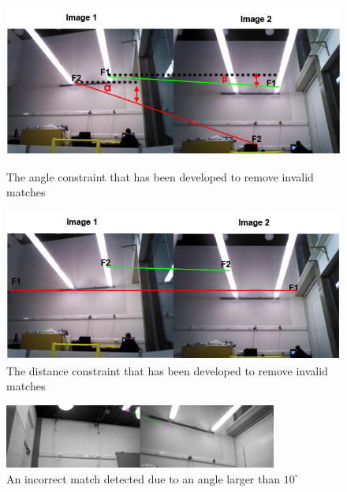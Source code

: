 \documentclass{report}
\begin{document}
\begin{figure}[ht!]
\begin{minipage}[b]{0.5\linewidth}
  \centering
    \includegraphics[width=1.0\textwidth]{../Drawings/constraints/angleConstraintMerged.jpg}
    \caption{The angle constraint that has been developed to remove invalid matches} 
    \label{fig:angleConstraint}
\end{minipage}
\begin{minipage}[b]{0.5\linewidth}
  \centering
    \includegraphics[width=1.0\textwidth]{../Drawings/constraints/distanceConstraint.jpg}
    \caption{The distance constraint that has been developed to remove invalid matches} 
    \label{fig:distanceConstraint}
\end{minipage}
\end{figure}

\begin{figure}[h!] 
  \centering
    \includegraphics[width=0.8\textwidth]{../Drawings/constraints/t_20_hd_55_OG_Left_MG_Right_2_12.jpg}
    \caption{An incorrect match detected due to an angle larger than $10^\circ$}
    \label{fig:imagesSide}
\end{figure}
\end{document}
